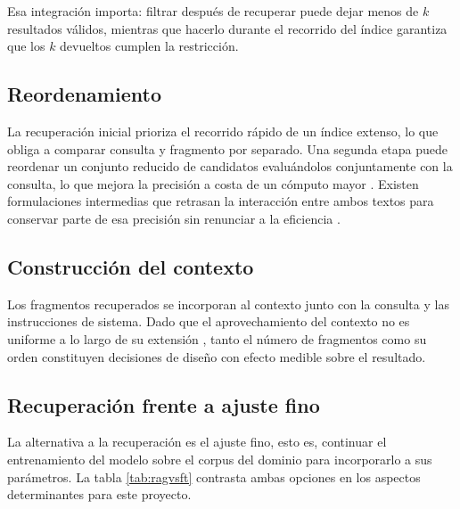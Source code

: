 Esa integración importa: filtrar después de recuperar puede dejar menos de $k$
resultados válidos, mientras que hacerlo durante el recorrido del índice
garantiza que los $k$ devueltos cumplen la restricción.

\subsection{Reordenamiento}

La recuperación inicial prioriza el recorrido rápido de un índice extenso, lo
que obliga a comparar consulta y fragmento por separado. Una segunda etapa puede
reordenar un conjunto reducido de candidatos evaluándolos conjuntamente con la
consulta, lo que mejora la precisión a costa de un cómputo mayor
\cite{nogueira2019passage}. Existen formulaciones intermedias que retrasan la
interacción entre ambos textos para conservar parte de esa precisión sin renunciar
a la eficiencia \cite{khattab2020colbert}.

\subsection{Construcción del contexto}

Los fragmentos recuperados se incorporan al contexto junto con la consulta y las
instrucciones de sistema. Dado que el aprovechamiento del contexto no es
uniforme a lo largo de su extensión \cite{liu2024lost}, tanto el número de
fragmentos como su orden constituyen decisiones de diseño con efecto medible
sobre el resultado.

\subsection{Recuperación frente a ajuste fino}

La alternativa a la recuperación es el ajuste fino, esto es, continuar el
entrenamiento del modelo sobre el corpus del dominio para incorporarlo a sus
parámetros. La tabla \ref{tab:ragvsft} contrasta ambas opciones en los aspectos
determinantes para este proyecto.

